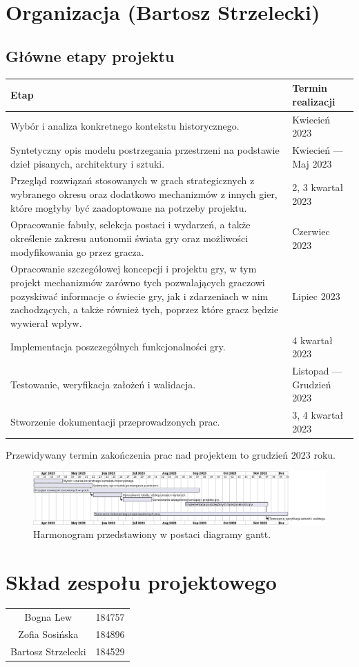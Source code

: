 \section{Organizacja (Bartosz Strzelecki)}
\subsection{Główne etapy projektu}
\begin{center}
  \begin{tabular}{| m{30em}| m{12em}||} 
  \hline
  Etap & Termin realizacji \\
  \hline\hline
  Wybór i analiza konkretnego kontekstu historycznego. & Kwiecień 2023 \\
  \hline
  Syntetyczny opis modelu postrzegania przestrzeni na podstawie dzieł pisanych, architektury i sztuki. & Kwiecień — Maj 2023 \\
  \hline
  Przegląd rozwiązań stosowanych w grach strategicznych z wybranego okresu oraz dodatkowo mechanizmów z innych gier, które mogłyby być zaadoptowane na potrzeby projektu. & 2, 3 kwartał 2023 \\
  \hline
  Opracowanie fabuły, selekcja postaci i wydarzeń, a także określenie zakresu autonomii świata gry oraz możliwości modyfikowania go przez gracza. & Czerwiec 2023 \\
  \hline
  Opracowanie szczegółowej koncepcji i projektu gry, w tym projekt mechanizmów zarówno tych pozwalających graczowi pozyskiwać informacje o świecie gry, jak i zdarzeniach w nim zachodzących, a także również tych, poprzez które gracz będzie wywierał wpływ. & Lipiec 2023 \\
  \hline
  Implementacja poszczególnych funkcjonalności gry. & 4 kwartał 2023 \\ 
  \hline
  Testowanie, weryfikacja założeń i walidacja. & Listopad — Grudzień 2023 \\
  \hline
  Stworzenie dokumentacji przeprowadzonych prac. & 3, 4 kwartał 2023 \\
  \hline
\end{tabular}
\end{center}
Przewidywany termin zakończenia prac nad projektem to grudzień 2023 roku.
\begin{figure}[htbp]
    \centering
    \includegraphics[width=1\textwidth]{uml/Harmonogram}
    \caption{Harmonogram przedstawiony w postaci diagramy gantt.}
\end{figure}
\section{Skład zespołu projektowego}
\begin{center}
  \begin{tabular}{ c c }
    Bogna Lew & 184757 \\
    Zofia Sosińska & 184896 \\
    Bartosz Strzelecki & 184529
  \end{tabular}
\end{center}
